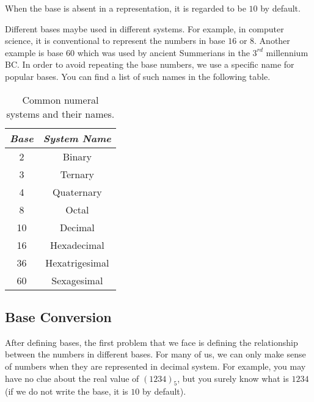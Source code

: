 \begin{note}
	When the base is absent in a representation, it is regarded to be $10$ by default.
\end{note}
Different bases maybe used in different systems. For example, in computer science, it is conventional to represent the numbers in base $16$ or $8$. Another example is base $60$ which was used by ancient Summerians in the $3^{rd}$ millennium BC. In order to avoid repeating the base numbers, we use a specific name for popular bases. You can find a list of such names in the following table.
	\begin{table}
		\centering
	\begin{tabular}{ | c | c | }
		\hline
		\textit{Base} & \textit{System Name} \\ \hline
		2 & Binary \\ \hline
		3 & Ternary \\ \hline
		4 & Quaternary \\ \hline
		8 & Octal \\ \hline
		10 & Decimal \\ \hline
		16 & Hexadecimal \\ \hline
		36 & Hexatrigesimal \\ \hline
		60 & Sexagesimal \\ \hline
	\end{tabular}
\caption{Common numeral systems and their names.} \label{tab:numeral}
\end{table}
\subsection{Base Conversion}
After defining bases, the first problem that we face is defining the relationship between the numbers in different bases. For many of us, we can only make sense of numbers when they are represented in decimal system. For example, you may have no clue about the real value of $(1234)_{5}$, but you surely know what is $1234$ (if we do not write the base, it is $10$ by default).

